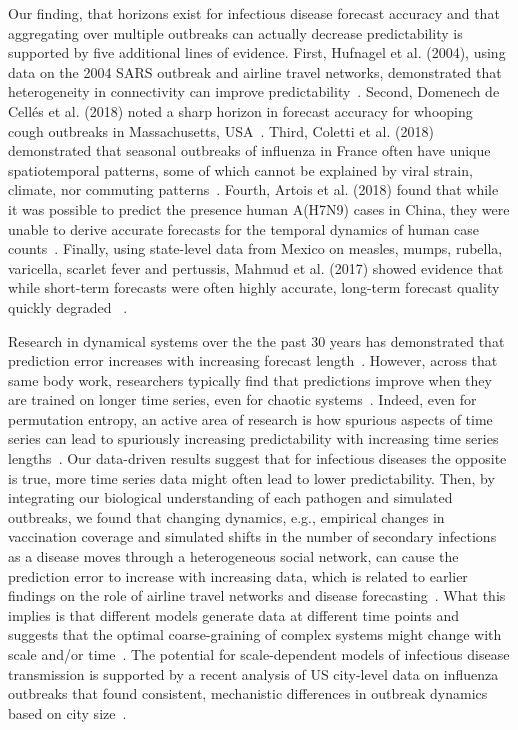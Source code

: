 \documentclass[fleqn,12pt]{wlscirep}
\begin{document}
Our finding, that horizons exist for infectious disease forecast accuracy and that aggregating over multiple outbreaks can actually decrease predictability is supported by five additional lines of evidence. First, Hufnagel et al. (2004), using data on the 2004 SARS outbreak and airline travel networks, demonstrated that heterogeneity in connectivity can improve predictability~\cite{hufnagel2004forecast}. Second, Domenech de Cell\'es et al. (2018) noted a sharp horizon in forecast accuracy for whooping cough outbreaks in Massachusetts, USA~\cite{de2018impact}. Third, Coletti et al. (2018) demonstrated that seasonal outbreaks of influenza in France often have unique spatiotemporal patterns, some of which cannot be explained by viral strain, climate, nor commuting patterns~\cite{coletti2018shifting}. Fourth, Artois et al. (2018) found that while it was possible to predict the presence human A(H7N9) cases in China, they were unable to derive accurate forecasts for the temporal dynamics of human case counts~\cite{artois2018changing}. Finally, using state-level data from Mexico on measles, mumps, rubella, varicella, scarlet fever and pertussis, Mahmud et al. (2017) showed evidence that while short-term forecasts were often highly accurate, long-term forecast quality quickly degraded ~\cite{mahmud2017comparative}.

Research in dynamical systems over the the past 30 years has demonstrated that prediction error increases with increasing forecast length~\cite{farmer1987predicting}.  However, across that same body work, researchers typically find that predictions improve when they are trained on longer time series, even for chaotic systems~\cite{farmer1987predicting}. Indeed, even for permutation entropy, an active area of research is how spurious aspects of time series can lead to spuriously increasing predictability with increasing time series lengths~\cite{zunino2017permutation}. Our data-driven results suggest that for infectious diseases the opposite is true, more time series data might often lead to lower predictability.  Then, by integrating our biological understanding of each pathogen and simulated outbreaks, we found that changing dynamics, e.g., empirical changes in vaccination coverage and simulated shifts in the number of secondary infections as a disease moves through a heterogeneous social network, can cause the prediction error to increase with increasing data, which is related to earlier findings on the role of airline travel networks and disease forecasting~\cite{colizza2006role}.  What this implies is that different models generate data at different time points and suggests that the optimal coarse-graining of complex systems might change with scale and\slash or time~\cite{wolpert2014optimal}. The potential for scale-dependent models of infectious disease transmission is supported by a recent analysis of US city-level data on influenza outbreaks that found consistent, mechanistic differences in outbreak dynamics based on city size~\cite{Dalziel75}.  
\end{document}
